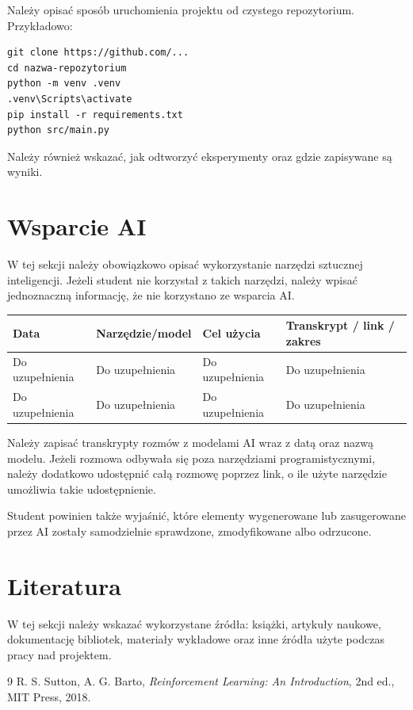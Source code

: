\documentclass[12pt]{article}
\begin{document}
Należy opisać sposób uruchomienia projektu od czystego repozytorium. Przykładowo:

\begin{verbatim}
git clone https://github.com/...
cd nazwa-repozytorium
python -m venv .venv
.venv\Scripts\activate
pip install -r requirements.txt
python src/main.py
\end{verbatim}

Należy również wskazać, jak odtworzyć eksperymenty oraz gdzie zapisywane są wyniki.

\section{Wsparcie AI}

W tej sekcji należy obowiązkowo opisać wykorzystanie narzędzi sztucznej inteligencji. Jeżeli student nie korzystał z takich narzędzi, należy wpisać jednoznaczną informację, że nie korzystano ze wsparcia AI.

\begin{center}
\begin{tabular}{p{}p{}p{}p{}}
\toprule
Data & Narzędzie/model & Cel użycia & Transkrypt / link / zakres \\
\midrule
Do uzupełnienia & Do uzupełnienia & Do uzupełnienia & Do uzupełnienia \\
Do uzupełnienia & Do uzupełnienia & Do uzupełnienia & Do uzupełnienia \\
\bottomrule
\end{tabular}
\end{center}

Należy zapisać transkrypty rozmów z modelami AI wraz z datą oraz nazwą modelu. Jeżeli rozmowa odbywała się poza narzędziami programistycznymi, należy dodatkowo udostępnić całą rozmowę poprzez link, o ile użyte narzędzie umożliwia takie udostępnienie.

Student powinien także wyjaśnić, które elementy wygenerowane lub zasugerowane przez AI zostały samodzielnie sprawdzone, zmodyfikowane albo odrzucone.

\section{Literatura}

W tej sekcji należy wskazać wykorzystane źródła: książki, artykuły naukowe, dokumentację bibliotek, materiały wykładowe oraz inne źródła użyte podczas pracy nad projektem.

\begin{thebibliography}{9}
R. S. Sutton, A. G. Barto, \textit{Reinforcement Learning: An Introduction}, 2nd ed., MIT Press, 2018.
\end{thebibliography}
\end{document}
